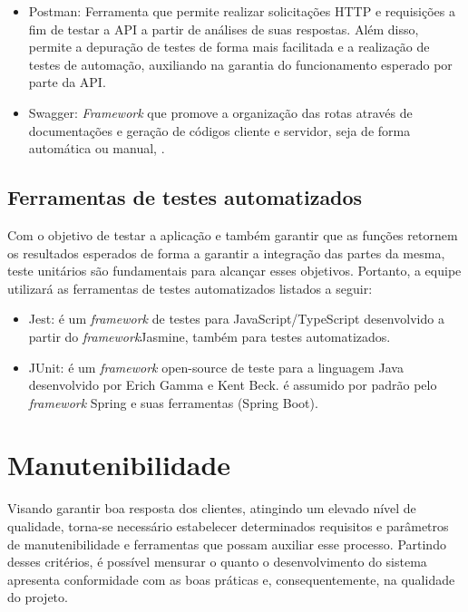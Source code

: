 \documentclass[
    12pt,               %
    openright,          %
    oneside,
    a4paper,            %
    BIBLATEX,           %
    TODO,               %
    english,            %
    brazil              %
    ]{ifsp-spo-inf-ctds}
\begin{document}
\begin{itemize}
                \item Postman:
                Ferramenta que permite realizar solicitações HTTP e requisições a fim de testar a API a partir de análises de suas respostas. Além disso, permite a depuração de testes de forma mais facilitada e a realização de testes de automação, auxiliando na garantia do funcionamento esperado por parte da API. 

                \item Swagger:
                \emph{Framework} que promove a organização das rotas através de documentações e geração de códigos cliente e servidor, seja de forma automática ou manual, .

            \end{itemize} 

        \subsection{Ferramentas de testes automatizados}

            Com o objetivo de testar a aplicação e também garantir que as funções retornem os resultados esperados de forma a garantir a integração das partes da mesma, teste unitários são fundamentais para alcançar esses objetivos. Portanto, a equipe utilizará as ferramentas de testes automatizados listados a seguir:

            \begin{itemize}
                \item Jest: é um \emph{framework} de testes para JavaScript/TypeScript desenvolvido a partir do \emph{framework}Jasmine, também para testes automatizados.
                \item JUnit: é um \emph{framework} open-source de teste para a linguagem Java desenvolvido por Erich Gamma e Kent Beck. é assumido por padrão pelo \emph{framework} Spring e suas ferramentas (Spring Boot).
            \end{itemize}    




    \section{Manutenibilidade}
    Visando garantir boa resposta dos clientes, atingindo um elevado nível de qualidade, torna-se necessário estabelecer determinados requisitos e parâmetros de manutenibilidade e ferramentas que possam auxiliar esse processo. Partindo desses critérios, é possível mensurar o quanto o desenvolvimento do sistema apresenta conformidade com as boas práticas e, consequentemente, na qualidade do projeto.
\end{document}
